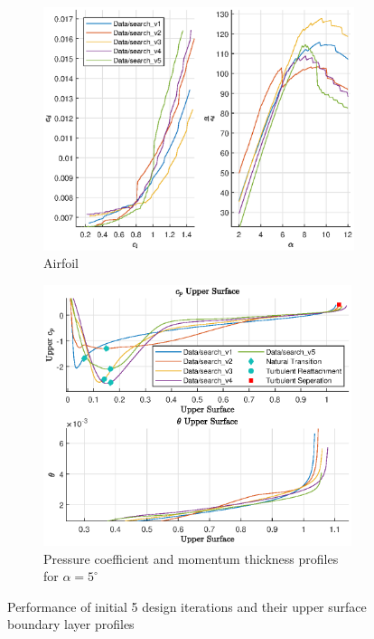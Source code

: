 \documentclass{article}
\begin{document}
\begin{figure}[H]
    \centering
    \begin{subfigure}{0.45\textwidth}
        \centering
        \includegraphics[width=1.2\textwidth, center]{figures/hiRe_lod_5.eps}
        \caption{Airfoil}
        \label{fig:v5_lod}
    \end{subfigure}
    \begin{subfigure}{0.54\textwidth}
        \centering
        \includegraphics[width=0.99\textwidth]{figures/hiRe_upperprofile_5_a5.eps}
        \caption{Pressure coefficient and momentum thickness profiles for $\alpha = 5^\circ$}
        \label{fig:v5_uprofile}
    \end{subfigure}
    \caption{Performance of initial 5 design iterations and their upper surface boundary layer profiles}
\end{figure}
\end{document}
